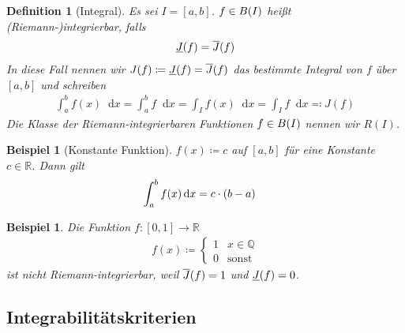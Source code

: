 \documentclass[11pt, twoside, a4paper]{article}
\theoremstyle{plain}
\newtheorem{definition}[blockelement]{Definition}
\newtheorem{beispiel}[blockelement]{Beispiel}
\newcommand{\pair}[1]{\left(#1\right)}
\newcommand{\of}[1]{\mathopen{}\mathclose{}\bgroup\left(#1\aftergroup\egroup\right)}
\newcommand{\interv}[1]{\left[#1\right]}
\newcommand{\fromto}{\rightarrow{}}
\newcommand{\definedas}[0]{\coloneqq}
\newcommand{\definedasbackwards}[0]{\eqqcolon}
\newcommand{\dif}{\mathop{}\!\mathrm{d}}
\newcommand{\R}{\mathbb{R}}
\newcommand{\Q}{\mathbb{Q}}
\begin{document}
    \begin{definition}[Integral]
        Es sei $I=\interv{a,b}$. $f\in B\of{I}$ heißt (Riemann-)integrierbar, falls
        \begin{align*}
            \underline{J}\of{f} = \overline{J}\of{f}
        \end{align*}
        In diese Fall nennen wir $J(f) \definedas \underline{J}\of{f} = \overline{J}\of{f}$ das bestimmte Integral von $f$ über $\interv{a,b}$ und schreiben
        \begin{align*}
            \int_{a}^{b} f(x) \dif x = \int_{a}^{b} f\dif x = \int_{I} f(x)\dif x = \int_{I} f\dif x \definedasbackwards J(f)
        \end{align*}
        Die Klasse der Riemann-integrierbaren Funktionen $f\in B\of{I}$ nennen wir $R(I)$.
    \end{definition}

    \begin{beispiel}[Konstante Funktion]
        \marginnote{[18. Apr]}
        $f(x) \definedas c$ auf $\interv{a,b}$ für eine Konstante $c\in\R$. Dann gilt
        \begin{align*}
            \int_{a}^{b} f\of{x} \dif x &= c\cdot\pair{b-a}
        \end{align*}
    \end{beispiel}

    \begin{beispiel}
        Die Funktion $f: \interv{0,1}\fromto\R$
        \begin{align*}
            f(x) \definedas \begin{cases}
                                1 &x\in \Q\\
                                0 &\text{sonst}
            \end{cases}
        \end{align*}
        ist nicht Riemann-integrierbar, weil $\overline{J}\of{f} = 1$ und $\underline{J}\of{f} = 0$.
    \end{beispiel}

    \subsection{Integrabilitätskriterien}
\end{document}
